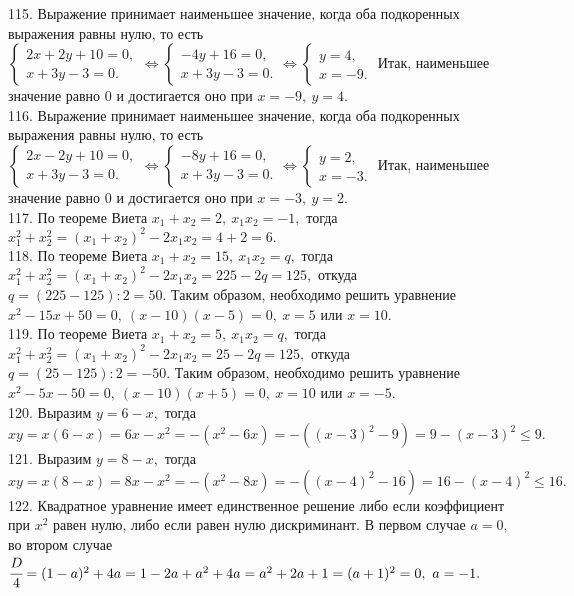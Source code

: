 115. Выражение принимает наименьшее значение, когда оба подкоренных выражения равны нулю, то есть $\begin{cases} 2x+2y+10=0,\\ x+3y-3=0.\end{cases}
\Leftrightarrow \begin{cases} -4y+16=0,\\ x+3y-3=0.\end{cases}\Leftrightarrow \begin{cases} y=4,\\ x=-9.\end{cases}$ Итак, наименьшее значение равно 0 и достигается оно при $x=-9,\ y=4.$\\
116. Выражение принимает наименьшее значение, когда оба подкоренных выражения равны нулю, то есть $\begin{cases} 2x-2y+10=0,\\ x+3y-3=0.\end{cases}
\Leftrightarrow \begin{cases} -8y+16=0,\\ x+3y-3=0.\end{cases}\Leftrightarrow \begin{cases} y=2,\\ x=-3.\end{cases}$ Итак, наименьшее значение равно 0 и достигается оно при $x=-3,\ y=2.$\\
117. По теореме Виета $x_1+x_2=2,\ x_1x_2=-1,$ тогда $x_1^2+x_2^2=(x_1+x_2)^2-2x_1x_2=4+2=6.$\\
118. По теореме Виета $x_1+x_2=15,\ x_1x_2=q,$ тогда $x_1^2+x_2^2=(x_1+x_2)^2-2x_1x_2=225-2q=125,$ откуда $q=(225-125):2=50.$ Таким образом, необходимо решить уравнение $x^2-15x+50=0,\ (x-10)(x-5)=0,\ x=5$ или $x=10.$\\
119. По теореме Виета $x_1+x_2=5,\ x_1x_2=q,$ тогда $x_1^2+x_2^2=(x_1+x_2)^2-2x_1x_2=25-2q=125,$ откуда $q=(25-125):2=-50.$ Таким образом, необходимо решить уравнение $x^2-5x-50=0,\ (x-10)(x+5)=0,\ x=10$ или $x=-5.$\\
120. Выразим $y=6-x,$ тогда $xy=x(6-x)=6x-x^2=-(x^2-6x)=-((x-3)^2-9)=9-(x-3)^2\leqslant 9.$\\
121. Выразим $y=8-x,$ тогда $xy=x(8-x)=8x-x^2=-(x^2-8x)=-((x-4)^2-16)=16-(x-4)^2\leqslant 16.$\\
122. Квадратное уравнение имеет единственное решение либо если коэффициент при $x^2$ равен нулю, либо если равен нулю дискриминант. В первом случае $a=0,$ во втором случае $\cfrac{D}{4}=(1-a)^2+4a=1-2a+a^2+4a=a^2+2a+1=(a+1)^2=0,\ a=-1.$\\
